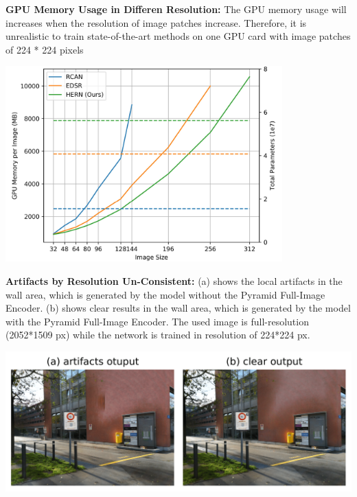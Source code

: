 \documentclass[landscape,a0paper,fontscale=0.292]{baposter}
\begin{document}
\begin{poster}
{    \begin{minipage}[t]{0.48\textwidth}
        \textbf{GPU Memory Usage in Differen Resolution:}
        The GPU memory usage will increases when the resolution of image patches increase.
        Therefore, it is unrealistic to train state-of-the-art methods on one GPU card with image patches of 224 * 224 pixels
        \vspace{-0.5em}
        \begin{center}
            \includegraphics[width=0.8\textwidth]{images/gpu_memories}
        \end{center}
    \end{minipage}
    \hfill
    \begin{minipage}[t]{0.465\textwidth}
    \textbf{Artifacts by Resolution Un-Consistent:} 
    (a) shows the local artifacts in the wall area, which is generated by the model without the Pyramid Full-Image Encoder.
    (b) shows clear results in the wall area, which is generated by the model with the Pyramid Full-Image Encoder.
    The used image is full-resolution (2052*1509 px) while the network is trained in resolution of 224*224 px.
        \begin{center}
            \vspace{-0.5em}
            \includegraphics[width=\textwidth]{images/visualize_artifacts}
        \end{center}
    \end{minipage}

}
\end{poster}
\end{document}
